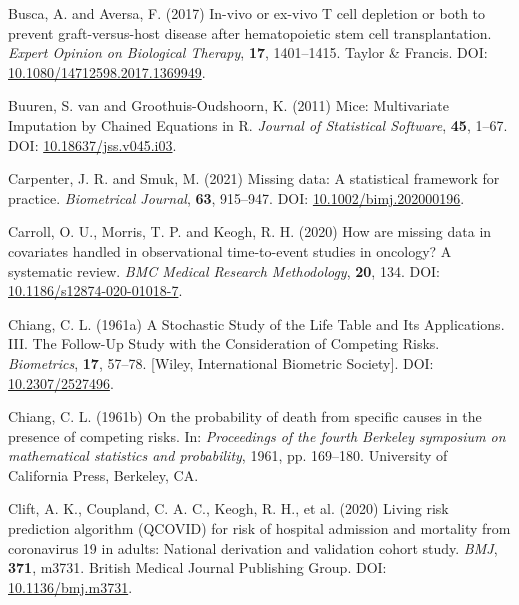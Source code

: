 \documentclass[
  letterpaper,
  DIV=11,
  numbers=noendperiod]{scrreprt}
\newlength{\cslhangindent}
\newlength{\cslentryspacingunit} %
\newenvironment{CSLReferences}[2] %
 {%
  \setlength{\parindent}{0pt}
  \ifodd #1
  \let\oldpar\par
  \def\par{\hangindent=\cslhangindent\oldpar}
  \fi
  \setlength{\parskip}{#2\cslentryspacingunit}
 }%
 {}
\begin{document}
\begin{CSLReferences}{1}{0}
\leavevmode{}%
Busca, A. and Aversa, F. (2017) In-vivo or ex-vivo {T} cell depletion or
both to prevent graft-versus-host disease after hematopoietic stem cell
transplantation. \emph{Expert Opinion on Biological Therapy},
\textbf{17}, 1401--1415. Taylor \& Francis. DOI:
\href{https://doi.org/10.1080/14712598.2017.1369949}{10.1080/14712598.2017.1369949}.

\leavevmode{}%
Buuren, S. van and Groothuis-Oudshoorn, K. (2011) Mice: {Multivariate
Imputation} by {Chained Equations} in {R}. \emph{Journal of Statistical
Software}, \textbf{45}, 1--67. DOI:
\href{https://doi.org/10.18637/jss.v045.i03}{10.18637/jss.v045.i03}.

\leavevmode{}%
Carpenter, J. R. and Smuk, M. (2021) Missing data: {A} statistical
framework for practice. \emph{Biometrical Journal}, \textbf{63},
915--947. DOI:
\href{https://doi.org/10.1002/bimj.202000196}{10.1002/bimj.202000196}.

\leavevmode{}%
Carroll, O. U., Morris, T. P. and Keogh, R. H. (2020) How are missing
data in covariates handled in observational time-to-event studies in
oncology? {A} systematic review. \emph{BMC Medical Research
Methodology}, \textbf{20}, 134. DOI:
\href{https://doi.org/10.1186/s12874-020-01018-7}{10.1186/s12874-020-01018-7}.

\leavevmode{}%
Chiang, C. L. (1961a) A {Stochastic Study} of the {Life Table} and {Its
Applications}. {III}. {The Follow-Up Study} with the {Consideration} of
{Competing Risks}. \emph{Biometrics}, \textbf{17}, 57--78. {[}Wiley,
International Biometric Society{]}. DOI:
\href{https://doi.org/10.2307/2527496}{10.2307/2527496}.

\leavevmode{}%
Chiang, C. L. (1961b) On the probability of death from specific causes
in the presence of competing risks. In: \emph{Proceedings of the fourth
{Berkeley} symposium on mathematical statistics and probability}, 1961,
pp. 169--180. University of California Press, Berkeley, CA.

\leavevmode{}%
Clift, A. K., Coupland, C. A. C., Keogh, R. H., et al. (2020) Living
risk prediction algorithm ({QCOVID}) for risk of hospital admission and
mortality from coronavirus 19 in adults: National derivation and
validation cohort study. \emph{BMJ}, \textbf{371}, m3731. British
Medical Journal Publishing Group. DOI:
\href{https://doi.org/10.1136/bmj.m3731}{10.1136/bmj.m3731}.


\end{CSLReferences}
\end{document}
